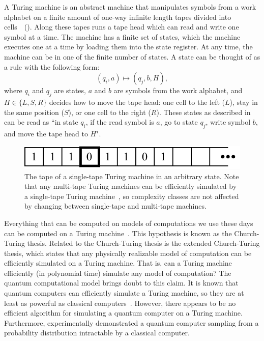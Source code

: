 A Turing machine is an abstract machine that manipulates symbols from a work alphabet on a finite amount of one-way infinite length tapes divided into cells~\cite{turing1937computable}~().
Along these tapes runs a tape head which can read and write one symbol at a time.
The machine has a finite set of states, which the machine executes one at a time by loading them into the state register.
At any time, the machine can be in one of the finite number of states.
A state can be thought of as a rule with the following form:
\begin{equation} \label{eqn:turing-state}
(q_i,a) \mapsto (q_j,b,H),
\end{equation}
where $q_i$ and $q_j$ are states, $a$ and $b$ are symbols from the work alphabet, and $H \in \{L, S, R\}$ decides how to move the tape head: one cell to the left ($L$), stay in the same position ($S$), or one cell to the right ($R$).
These states as described in  can be read as ``in state $q_i$, if the read symbol is $a$, go to state $q_j$, write symbol $b$, and move the tape head to $H$".

\begin{figure}[ht]
    \centering
    \includegraphics[width=0.5\linewidth]{figures/single-tape-turing-machine.pdf}
    \caption[The tape of a single-tape Turing machine in an arbitrary state.]{The tape of a single-tape Turing machine in an arbitrary state. Note that any multi-tape Turing machines can be efficiently simulated by a single-tape Turing machine~\cite{hartmanis1965computational}, so complexity classes are not affected by changing between single-tape and multi-tape machines.}
    \label{fig:single-tape-turing-machine}
\end{figure}

Everything that can be computed on models of computations we use these days can be computed on a Turing machine~\cite{dershowitz2008natural}.
This hypothesis is known as the Church-Turing thesis.
Related to the Church-Turing thesis is the extended Church-Turing thesis, which states that any physically realizable model of computation can be efficiently simulated on a Turing machine.
That is, can a Turing machine efficiently (in polynomial time) simulate any model of computation?
The quantum computational model brings doubt to this claim.
It is known that quantum computers can efficiently simulate a Turing machine, so they are at least as powerful as classical computers~\cite{bennett1973logical}.
However, there appears to be no efficient algorithm for simulating a quantum computer on a Turing machine.
Furthermore, \textcite{arute2019quantum} experimentally demonstrated a quantum computer sampling from a probability distribution intractable by a classical computer.

